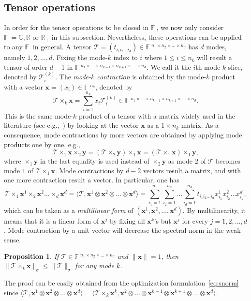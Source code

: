 \documentclass[11pt]{article}
\newtheorem{proposition}[theorem]{Proposition}
\newcommand{\C}{\mathbb{C}}
\newcommand{\R}{\mathbb{R}}
\newcommand{\BF}{\mathbb{F}\:\!}
\newcommand{\TT}{\mathcal{T}}
\newcommand{\bx}{\boldsymbol{x}}
\newcommand{\by}{\boldsymbol{y}}
\begin{document}
\subsection{Tensor operations}

In order for the tensor operations to be closed in $\BF$, we now only consider $\BF=\C,\R$ or $\R_+$ in this subsection. Nevertheless, these operations can be applied to any $\BF$ in general. A tensor $\TT=(t_{i_1i_2\dots i_d})\in\BF^{n_1\times n_2\times\dots\times n_d}$ has $d$ modes, namely $1,2,\dots,d$. Fixing the mode-$k$ index to $i$ where $1\le i\le n_k$ will result a tensor of order $d-1$ in $\BF^{n_1\times\dots \times n_{k-1}\times n_{k+1}\times\dots\times n_d}$. We call it the $i$th mode-$k$ slice, denoted by $\TT^{(k)}_i$. The {\em mode-$k$ contraction} is obtained by the mode-$k$ product with a vector $\bx=(x_i)\in\BF^{n_k}$, denoted by
$$
\TT\times_k\bx=\sum_{i=1}^{n_k}x_i\TT^{(k)}_i\in \BF^{n_1\times\dots \times n_{k-1}\times n_{k+1}\times\dots\times n_d}.
$$
This is the same mode-$k$ product of a tensor with a matrix widely used in the literature (see e.g.,~\cite{KB09}) by looking at the vector $\bx$ as a $1\times n_k$ matrix. As a consequence, mode contractions by more vectors are obtained by applying mode products one by one, e.g.,
$$
\TT \times_1 \bx \times_2 \by =  (\TT \times_2 \by) \times_1 \bx = (\TT \times_1 \bx) \times_1 \by,
$$
where $\times_1 \by$ in the last equality is used instead of $\times_2 \by$ as mode $2$ of $\TT$ becomes mode $1$ of $\TT \times_1 \bx$. Mode contractions by $d-2$ vectors result a matrix, and with one more contraction result a vector. In particular, one has
\begin{equation} \label{eq:multilinear}
   \TT \times_1 \bx^1 \times_2 \bx^2 \dots \times_d \bx^d
= \langle \TT, \bx^1 \otimes\bx^2\otimes \dots \otimes \bx^d \rangle
=\sum_{i_1=1}^{n_1}\sum_{i_2=1}^{n_2}\dots\sum_{i_d=1}^{n_d}t_{i_1i_2\dots i_d}x^1_{i_1}x^2_{i_2}\dots x^d_{i_d},
\end{equation}
which can be taken as a {\em multilinear form} of $(\bx^1,\bx^2,\dots,\bx^d)$. By multilinearity, it means that it is a linear form of $\bx^j$ by fixing all $\bx^k$'s but $\bx^j$ for every $j=1,2,\dots,d$. Mode contraction by a unit vector will decrease the spectral norm in the weak sense.
\begin{proposition}\label{thm:contraction}
If $\TT\in\BF^{n_1\times n_2\times\dots\times n_d}$ and $\|\bx\|=1$, then $\|\TT\times_k \bx\|_\sigma\le\|\TT\|_\sigma$ for any mode $k$.
\end{proposition}
The proof can be easily obtained from the optimization formulation~\eqref{eq:snorm} since $\langle \TT, \bx^1 \otimes\bx^2\otimes \dots \otimes \bx^d \rangle
= \langle \TT \times_k \bx^k, \bx^2 \otimes \dots\otimes \bx^{k-1}\otimes \bx^{k+1} \otimes\dots\otimes \bx^d \rangle$.
\end{document}

